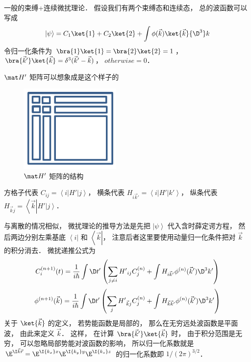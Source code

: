 

一般的束缚+连续微扰理论． 假设我们有两个束缚态和连续态， 总的波函数可以写成
 \begin{equation}
\left| \psi  \right\rangle  = {C_1}\ket{1}  + {C_2}\ket{2}  + \int {\phi (\vec k)\ket{\vec k}{\D ^3}k} 
\end{equation}
令归一化条件为 $\bra{1}\ket{1} = \bra{2}\ket{2} = 1$，  $\bra{\vec k'}\ket{\vec k}  = {\delta ^3}(\vec k' - \vec k)$，  $otherwise = 0$． 

 $\mat H'$  矩阵可以想象成是这个样子的
\begin{figure}[h]
\centering
\includegraphics[width=5cm]{./figures/PTCont.pdf}
\caption{$\mat H'$ 矩阵的结构} 
\end{figure}

方格子代表 ${C_{ij}} = \left\langle i \right|H'\left| j \right\rangle $，  横条代表 ${H_{i\vec k'}} = \left\langle i \right|H'\left| {k'} \right\rangle $，  纵条代表 ${H_{\vec kj}} = \left\langle {\vec k} \right|H'\left| j \right\rangle $． 

与离散的情况相似， 微扰理论的推导方法是先把 $\left| \psi  \right\rangle $ 代入含时薛定谔方程， 然后两边分别左乘基底 $\left\langle i \right|$ 和 $\left\langle {\vec k} \right|$，  注意后者这里要使用动量归一化条件把对 $\vec k$ 的积分消去． 微扰递推公式为
 \begin{equation}
C_i^{(n + 1)}(t) = \frac{1}{{i\hbar }}\int {\D t'\left( {\sum\limits_{j \ne i} {{{H'}_{ij}}C_j^{(n)}}  + \int {{H_{i\vec k'}}{\phi ^{(n)}}(\vec k'){\D ^3}k'} } \right)} 
\end{equation}
 \begin{equation}
 {\phi ^{(n + 1)}}(\vec k) = \frac{1}{{i\hbar }}\int {\D t'\left( {\sum\limits_j {{{H'}_{\vec kj}}C_j^{(n)}}  + \int {{H_{\vec k\vec k'}}{\phi ^{(n)}}(\vec k'){\D ^3}k'} } \right)} 
\end{equation}
关于 $\ket{\vec k}$  的定义， 若势能函数是局部的， 那么在无穷远处波函数是平面波， 由此来定义 $\vec k$．  这样， 在计算 $\bra{\vec k'}\ket{\vec k}$ 时， 由于积分范围是无穷， 可以忽略局部势能对波函数的影响， 所以归一化系数就是 ${\E^{\I \vec k\vec r}} = {\E^{\I{k_x}x}}{\E^{\I{k_y}y}}{\E^{\I{k_z}z}}$ 的归一化系数即 $1/{(2\pi )^{3/2}}$． 
 
